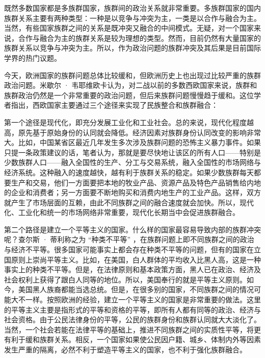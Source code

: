 既然多数国家都是多族群国家，族群间的政治关系就非常重要。多族群国家的国内族群关系主要有两种类型：一种是以竞争与冲突为主，一类是以合作与融合为主。当然，有些国家族群之间的关系是既冲突又融合的中间模式。无疑，对一个国家来说，合作与融合为主的族群关系是较为理想的类型。然而，目前仍然有大量国家的族群关系以竞争与冲突为主。所以，作为政治问题的族群冲突及其后果是目前国际学界的热门议题。

今天，欧洲国家的族群问题总体比较缓和，但欧洲历史上也出现过比较严重的族群政治问题。米歇尔 · 韦耶维欧卡认为，对二战以前的多数西欧国家来说，族群和族群政治仍然是一个非常重要的政治问题，但后来族群问题慢慢趋于缓和。这位学者指出，西欧国家主要通过三个途径来实现了民族整合和族群融合：

第一个途径是现代化，即充分发展工业化和工业社会。总的来说，现代化程度越高，原先基于原始身份的认同就会降低。经济因素对族群身份认同改变的影响非常大。比如，中国某省区最近几年发生多次涉及族群问题的恐怖主义暴力事件。如果只提一条政策建议的话，笔者认为，那就是要尽快地让该区的所有人口——特别是少数族群人口——融入全国性的生产、分工与交易系统，融入全国性的市场网络与经济系统。这种融入的速度越快，越有利于族群关系的稳定。如果少数族群每天都要生产和交易，他们一方面要把本地的牧业产品、资源产品及特色产品销售给内地的企业和消费者；另一方面要不断地购买和消费内地生产的工业产品。这样，双方就产生了市场层面的互赖，由此不同族群之间的融合速度就会加快。所以，现代化、工业化和统一的市场网络非常重要，现代化长期当中会促进族群融合。

第二个路径是建立一个平等主义的国家。什么样的国家最容易导致内部的族群冲突呢？查尔斯 · 蒂利称之为 “种类不平等” ，在族群问题上即不同族群之间的政治与经济不平等。很多国家可能事实上都会存在种类不平等的问题，但有的国家在立国原则上崇尚平等主义。比如，在美国，白人群体的平均收入比黑人高，这是一种事实上的种类不平等。但是，在法律原则和基本政策方面，黑人已在政治、经济及社会权利上获得了跟白人同等的地位。所以，美国奉行的就是平等主义原则。如今，美国黑人族裔都能当选总统。但是，在很多别的国家，不同族群之间的情况可能大不一样。按照欧洲的经验，建立一个平等主义的国家是非常重要的做法。这里的平等主义主要是指形式的平等和资格的平等，即所有人都有同等的政治、经济与社会资格。由于公民法律身份的平等，公民的族群身份和族群认同就大大淡化了。当然，一个社会若能在法律平等的基础上，推进不同族群之间的实质性平等，将更有利于缓和族群关系。相反，一个国家如果使公民因户籍、城乡、体制内外等因素发生严重的隔离，必然不利于塑造平等主义的国家，也不利于强化族群融合。

